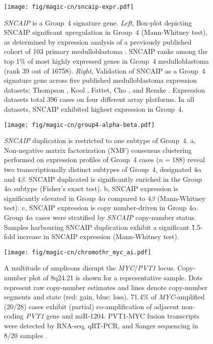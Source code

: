 \documentclass[11pt,letterpaper]{article}
\theoremstyle{definition}
\begin{document}
\begin{figure}[h]
	\begin{center}
		\texttt{[image: fig/magic-cn/sncaip-expr.pdf]}
	\end{center}
	\caption[\emph{SNCAIP} is a Group~4 signature gene]
	{
	\emph{SNCAIP} is a Group~4 signature gene.
	\emph{Left}, Box-plot depicting SNCAIP significant upregulation in Group~4 (Mann-Whitney test), as determined by expression analysis of a previously published cohort of 103 primary medulloblastoma . SNCAIP ranks among the top 1\% of most highly expressed genes in Group~4 medulloblastoma (rank 39 out of 16758).
	\emph{Right}, Validation of SNCAIP as a Group~4 signature gene across five published medulloblastoma expression datasets: Thompson , Kool , Fattet, Cho , and Remke . Expression datasets total 396 cases on four different array platforms. In all datasets, SNCAIP exhibited highest expression in Group~4.
	}
	\label{fig:sncaip-expr}
\end{figure}

\begin{figure}[h]
	\begin{center}
		\texttt{[image: fig/magic-cn/group4-alpha-beta.pdf]}
	\end{center}
	\caption[\emph{SNCAIP} duplication is restricted to one subtype of Group~4]
	{
	\emph{SNCAIP} duplication is restricted to one subtype of Group~4.
	\textsf{a}, Non-negative matrix factorization (NMF) consensus clustering performed on expression profiles of Group~4 cases ($n = 188$) reveal two transcriptionally distinct subtypes of Group~4, designated $4\alpha$ and $4\beta$. SNCAIP duplicated is significantly enriched in the Group $4\alpha$ subtype (Fisher's exact test).
	\textsf{b}, SNCAIP expression is significantly elevated in Group $4\alpha$ compared to $4\beta$ (Mann-Whitney test).
	\textsf{c}, SNCAIP expression is copy number-driven in Group $4\alpha$. Group $4\alpha$ cases were stratified by \emph{SNCAIP} copy-number status. Samples harbouring SNCAIP duplication exhibit a significant \~1.5-fold increase in SNCAIP expression (Mann-Whitney test).
	}
	\label{fig:group4-alpha-beta}
\end{figure}

\begin{figure}[h]
	\begin{center}
		\texttt{[image: fig/magic-cn/chromothr\_myc\_ai.pdf]}
	\end{center}
	\caption[A multitude of amplicons disrupt the \emph{MYC}/\emph{PVT1} locus]
	{
	A multitude of amplicons disrupt the \emph{MYC}/\emph{PVT1} locus.
	Copy-number plot of 8q24.21 is shown for a representative sample. Dots represent raw copy-number estimates and lines denote copy-number segments and state (red: gain, blue: loss). 71.4\% of \emph{MYC}-amplified (20/28) cases exhibit (partial) co-amplification of adjacent non-coding \emph{PVT1} gene and miR-1204. PVT1-MYC fusion transcripts were detected by RNA-seq, qRT-PCR, and Sanger sequencing in 8/20 samples .
	}
	\label{fig:chromothr_myc}
\end{figure}
\end{document}
